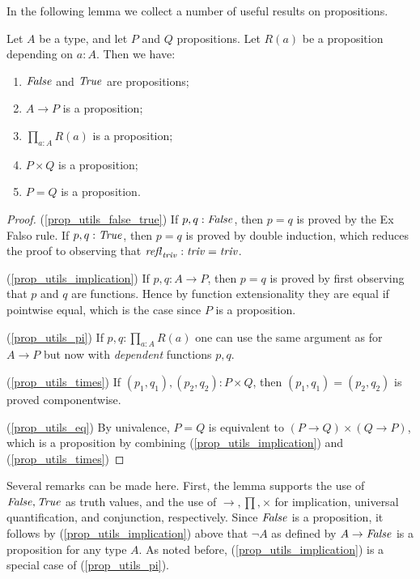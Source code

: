 In the following lemma we collect a number of useful results on propositions.

\begin{lemma}\label{lem:prop_utils}
Let $A$ be a type, and let $P$ and $Q$ propositions.
Let $R(a)$ be a proposition depending on $a:A$. Then we have:
\begin{enumerate}
\item\label{prop_utils_false_true} $\mathop{\mathit{False}}$ and $\mathop{\mathit{True}}$ are propositions;
\item\label{prop_utils_implication} $A\to P$ is a proposition;
\item\label{prop_utils_pi} $\prod_{a:A} R(a)$ is a proposition;
\item\label{prop_utils_times} $P\times Q$ is a proposition;
\item\label{prop_utils_eq} $P = Q$ is a proposition.
\end{enumerate}
\end{lemma}

\begin{proof}
(\ref{prop_utils_false_true})
If $p,q : \mathop{\mathit{False}}$, then $p=q$ is proved by the Ex Falso rule.
If $p,q : \mathop{\mathit{True}}$, then $p=q$ is proved by double induction,
which reduces the proof to observing that $\mathop{{\it refl}_{\mathop{\mathit{triv}}}}: \mathop{\mathit{triv}}=\mathop{\mathit{triv}}$.

(\ref{prop_utils_implication})
If $p,q : A\to P$, then $p=q$ is proved by first observing that $p$ and $q$
are functions. Hence by function extensionality they are equal if pointwise
equal, which is the case since $P$ is a proposition.

(\ref{prop_utils_pi})
If $p,q : \prod_{a:A} R(a)$ one can use the same argument as for $A\to P$
but now with \emph{dependent} functions $p,q$.

(\ref{prop_utils_times})
If $(p_1,q_1),(p_2,q_2) : P\times Q$, then $(p_1,q_1)=(p_2,q_2)$
is proved componentwise. 

(\ref{prop_utils_eq})
By univalence, $P = Q$ is equivalent to
$(P\to Q)\times(Q\to P)$, which is a proposition by 
combining (\ref{prop_utils_implication}) and
(\ref{prop_utils_times})
\end{proof}

Several remarks can be made here. First, the lemma supports the
use of $\mathop{\mathit{False}},\mathop{\mathit{True}}$ as truth values, and the use of
$\to,\prod,\times$ for implication, universal quantification,
and conjunction, respectively. Since $\mathop{\mathit{False}}$ is a proposition,
it follows by (\ref{prop_utils_implication}) above that
$\neg A$ as defined by $A\to\mathop{\mathit{False}}$ is a proposition for any type $A$.
As noted before, (\ref{prop_utils_implication}) is a
special case of (\ref{prop_utils_pi}).

